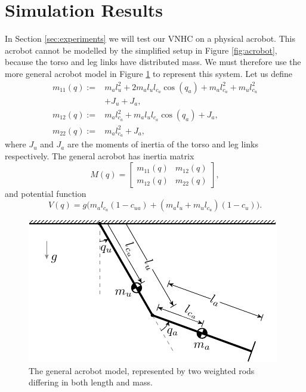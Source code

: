 \documentclass[journal,twoside,web, onecolumn, draftcls]{ieeecolor}
\begin{document}
\section{Simulation Results}\label{sec:simulations}
In Section \ref{sec:experiments} we will test our VNHC on a physical acrobot.
This acrobot cannot be modelled by the simplified setup in Figure
\ref{fig:acrobot}, because the torso and leg links have 
distributed mass. 
We must therefore use the more general acrobot model in Figure
\ref{fig:acrobot-model} to represent this system.
Let us define 
\begin{align*}
    m_{11}(q) := &m_a l_u^2 + 2m_al_ul_{c_a}\cos(q_a) + m_al_{c_a}^2 +
    m_ul_{c_u}^2 \\
                 &+ J_u + J_a
                 , \\
    m_{12}(q) := &m_al_{c_a}^2 + m_al_ul_{c_a}\cos(q_a) + J_a
    , \\
    m_{22}(q) := &m_al_{c_a}^2 + J_a,
\end{align*}
where \(J_u\) and \(J_a\) are the moments of inertia of the torso and leg links
respectively. 
The general acrobot has inertia matrix
\begin{equation*}
    M(q) = \begin{bmatrix}
        m_{11}(q) & m_{12}(q) \\
        m_{12}(q) & m_{22}(q)
    \end{bmatrix}
    ,
\end{equation*}
and potential function
\begin{equation*}
    V(q) = g\big(m_al_{c_a}(1-c_{ua})
    + (m_al_u + m_ul_{c_u})(1-c_u)\big)
    .
\end{equation*}

\begin{figure}
    \centering
    \includegraphics[width=0.8\linewidth]{acrobot_model.pdf}
    \caption{The general acrobot model, represented by two weighted rods
    differing in both length and mass.}%
    \label{fig:acrobot-model}
\end{figure}
\end{document}
